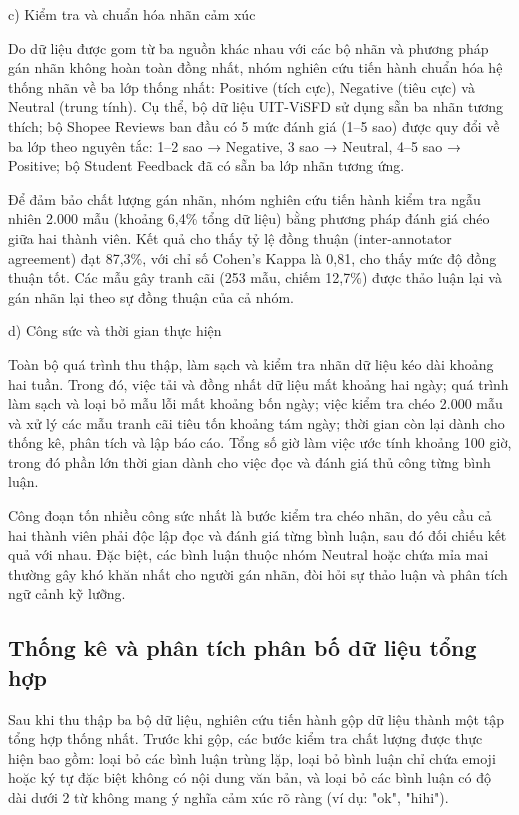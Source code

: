 \documentclass[14pt, a4paper]{report}
\begin{document}
c) Kiểm tra và chuẩn hóa nhãn cảm xúc


Do dữ liệu được gom từ ba nguồn khác nhau với các bộ nhãn và phương pháp gán nhãn không hoàn toàn đồng nhất, nhóm nghiên cứu tiến hành chuẩn hóa hệ thống nhãn về ba lớp thống nhất: Positive (tích cực), Negative (tiêu cực) và Neutral (trung tính). Cụ thể, bộ dữ liệu UIT-ViSFD sử dụng sẵn ba nhãn tương thích; bộ Shopee Reviews ban đầu có 5 mức đánh giá (1–5 sao) được quy đổi về ba lớp theo nguyên tắc: 1–2 sao → Negative, 3 sao → Neutral, 4–5 sao → Positive; bộ Student Feedback đã có sẵn ba lớp nhãn tương ứng.


Để đảm bảo chất lượng gán nhãn, nhóm nghiên cứu tiến hành kiểm tra ngẫu nhiên 2.000 mẫu (khoảng 6,4\% tổng dữ liệu) bằng phương pháp đánh giá chéo giữa hai thành viên. Kết quả cho thấy tỷ lệ đồng thuận (inter-annotator agreement) đạt 87,3\%, với chỉ số Cohen's Kappa là 0,81, cho thấy mức độ đồng thuận tốt. Các mẫu gây tranh cãi (253 mẫu, chiếm 12,7\%) được thảo luận lại và gán nhãn lại theo sự đồng thuận của cả nhóm.


d) Công sức và thời gian thực hiện


Toàn bộ quá trình thu thập, làm sạch và kiểm tra nhãn dữ liệu kéo dài khoảng hai tuần. Trong đó, việc tải và đồng nhất dữ liệu mất khoảng hai ngày; quá trình làm sạch và loại bỏ mẫu lỗi mất khoảng bốn ngày; việc kiểm tra chéo 2.000 mẫu và xử lý các mẫu tranh cãi tiêu tốn khoảng tám ngày; thời gian còn lại dành cho thống kê, phân tích và lập báo cáo. Tổng số giờ làm việc ước tính khoảng 100 giờ, trong đó phần lớn thời gian dành cho việc đọc và đánh giá thủ công từng bình luận.


Công đoạn tốn nhiều công sức nhất là bước kiểm tra chéo nhãn, do yêu cầu cả hai thành viên phải độc lập đọc và đánh giá từng bình luận, sau đó đối chiếu kết quả với nhau. Đặc biệt, các bình luận thuộc nhóm Neutral hoặc chứa mỉa mai thường gây khó khăn nhất cho người gán nhãn, đòi hỏi sự thảo luận và phân tích ngữ cảnh kỹ lưỡng.


\subsection{Thống kê và phân tích phân bố dữ liệu tổng hợp}


Sau khi thu thập ba bộ dữ liệu, nghiên cứu tiến hành gộp dữ liệu thành một tập tổng hợp thống nhất. Trước khi gộp, các bước kiểm tra chất lượng được thực hiện bao gồm: loại bỏ các bình luận trùng lặp, loại bỏ bình luận chỉ chứa emoji hoặc ký tự đặc biệt không có nội dung văn bản, và loại bỏ các bình luận có độ dài dưới 2 từ không mang ý nghĩa cảm xúc rõ ràng (ví dụ: "ok", "hihi").
\end{document}
